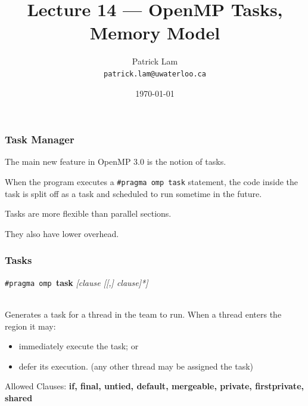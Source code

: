 

\title{Lecture 14 --- OpenMP Tasks, Memory Model }

\author{Patrick Lam \\ \small \texttt{patrick.lam@uwaterloo.ca}}
\date{\today}




\begin{frame}
  \titlepage

 \end{frame}


\begin{frame}[fragile]
\frametitle{Task Manager}

The main new feature in OpenMP 3.0 is the notion of \alert{tasks}. 

When the program executes a \verb+#pragma omp task+ statement, the code
inside the task is split off as a task and scheduled to run sometime
in the future. 

Tasks are more flexible than parallel sections.

They also have lower overhead.

\end{frame}


\begin{frame}
\frametitle{Tasks}

 \begin{center}
    {\tt \#pragma omp }{\bf task} {\it [clause [[,] clause]*]}
  \end{center}~\\

Generates a task for a thread in the team to run.
     When a thread enters the region it may:
\begin{itemize}
        \item immediately execute the task; or
        \item defer its execution. (any other thread may be assigned the task)
\end{itemize}

  Allowed Clauses: {\bf if, final, untied, default, mergeable, private,
  firstprivate, shared}

\end{frame}


